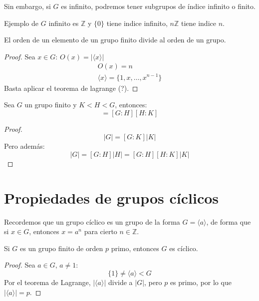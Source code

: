 Sin embargo, si $G$ es infinito, podremos tener subgrupos de índice infinito o finito. 

\begin{ejemplo}
    Ejemplo de $G$ infinito es $\mathbb{Z}$ y $\{0\}$ tiene indice infinito, $n\mathbb{Z}$ tiene indice $n$.
\end{ejemplo}

\begin{coro}
    El orden de un elemento de un grupo finito divide al orden de un grupo.
    \begin{proof}
        Sea $x\in G$: $O(x) = |\langle x \rangle |$
        \begin{gather*}
            O(x) = n \\
            \langle x \rangle  = \{1, x, \ldots, x^{n-1}\}
        \end{gather*}
        Basta aplicar el teorema de lagrange (?).
    \end{proof}
\end{coro}

\begin{coro}
    Sea $G$ un grupo finito y $K < H < G$, entonces:
    \begin{equation*}
        [G:K] = [G:H][H:K]
    \end{equation*}
    \begin{proof}
        \begin{equation*}
            |G| = [G:K]|K|
        \end{equation*}
        Pero además:
        \begin{equation*}
            |G| = [G:H]|H| = [G:H][H:K]|K|
        \end{equation*}
    \end{proof}
\end{coro}

\section{Propiedades de grupos cíclicos}
Recordemos que un grupo cíclico es un grupo de la forma $G = \langle a \rangle $, de forma que si $x\in G$, entonces $x= a^n$ para cierto $n\in \mathbb{Z}$.

\begin{prop}
    Si $G$ es un grupo finito de orden $p$ primo, entonces $G$ es cíclico.
    \begin{proof}
        Sea $a\in G$, $a\neq 1$:
        \begin{equation*}
            \{1\} \neq \langle a \rangle < G
        \end{equation*}
        Por el teorema de Lagrange, $|\langle a \rangle | $ divide a $|G|$, pero $p$ es primo, por lo que $|\langle a \rangle | = p$.
    \end{proof}
\end{prop}

